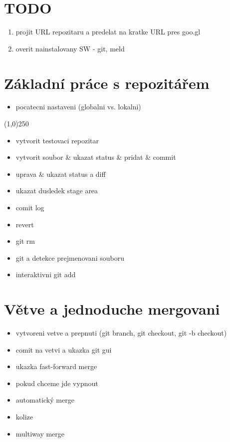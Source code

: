 \documentclass[12pt]{article}
\begin{document}
\section{TODO}

\begin{enumerate}
	\item projit URL repozitaru a predelat na kratke URL pres goo.gl
	\item overit nainstalovany SW - git, meld
\end{enumerate}

\newpage

\section{Základní práce s repozitářem}

\begin{itemize}
	\item pocatecni nastaveni (globalni vs. lokalni)
\end{itemize}

\begin{center}\line(1,0){250}\end{center}

\begin{itemize}
	\item vytvorit testovaci repozitar
	\item vytvorit soubor \& ukazat status \& pridat \& commit
	\item uprava \& ukazat status a diff
	\item ukazat dusledek stage area
	\item comit log
	\item revert
	\item git rm
	\item git a detekce prejmenovani souboru
	\item interaktivni git add
\end{itemize}

\newpage

\section{Větve a jednoduche mergovani}

\begin{itemize}
	\item vytvoreni vetve a prepnuti (git branch, git checkout, git -b checkout)
	\item comit na vetvi a ukazka git gui
	\item ukazka fast-forward merge
	\item pokud chceme jde vypnout
	\item automatický merge
	\item kolize
	\item multiway merge
\end{itemize}
\end{document}
